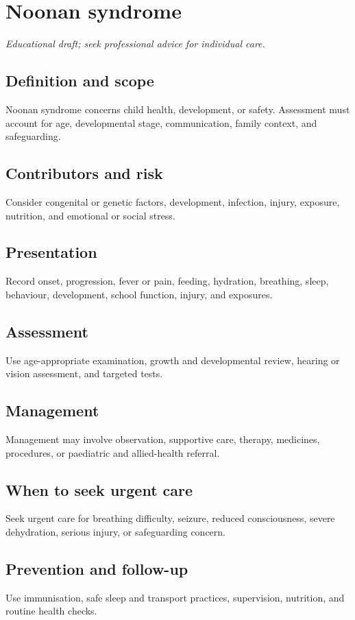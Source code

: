 \chapter{Noonan syndrome}

\medskip
\noindent\textit{Educational draft; seek professional advice for individual care.}

\section*{Definition and scope}
Noonan syndrome concerns child health, development, or safety. Assessment must account for age, developmental stage, communication, family context, and safeguarding.

\section*{Contributors and risk}
Consider congenital or genetic factors, development, infection, injury, exposure, nutrition, and emotional or social stress.

\section*{Presentation}
Record onset, progression, fever or pain, feeding, hydration, breathing, sleep, behaviour, development, school function, injury, and exposures.

\section*{Assessment}
Use age-appropriate examination, growth and developmental review, hearing or vision assessment, and targeted tests.

\section*{Management}
Management may involve observation, supportive care, therapy, medicines, procedures, or paediatric and allied-health referral.

\section*{When to seek urgent care}
Seek urgent care for breathing difficulty, seizure, reduced consciousness, severe dehydration, serious injury, or safeguarding concern.

\section*{Prevention and follow-up}
Use immunisation, safe sleep and transport practices, supervision, nutrition, and routine health checks.

